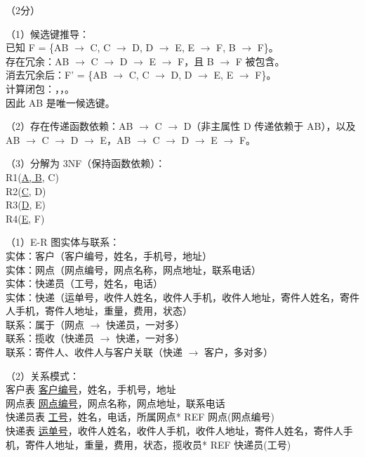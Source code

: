 \documentclass[a4paper,11pt]{article}
\begin{document}
\q （2分）


\q （1）候选键推导：\\
已知 F = \{AB $\rightarrow$ C, C $\rightarrow$ D, D $\rightarrow$ E, E $\rightarrow$ F, B $\rightarrow$ F\}。\\
存在冗余：AB $\rightarrow$ C $\rightarrow$ D $\rightarrow$ E $\rightarrow$ F，且 B $\rightarrow$ F 被包含。\\
消去冗余后：F' = \{AB $\rightarrow$ C, C $\rightarrow$ D, D $\rightarrow$ E, E $\rightarrow$ F\}。\\
计算闭包：，，。\\
因此 AB 是唯一候选键。

\par（2）存在传递函数依赖：AB $\rightarrow$ C $\rightarrow$ D（非主属性 D 传递依赖于 AB），以及 AB $\rightarrow$ C $\rightarrow$ D $\rightarrow$ E，AB $\rightarrow$ C $\rightarrow$ D $\rightarrow$ E $\rightarrow$ F。

\par（3）分解为 3NF（保持函数依赖）：\\
R1(\underline{A, B}, C)\\
R2(\underline{C}, D)\\
R3(\underline{D}, E)\\
R4(\underline{E}, F)


\q （1）E-R 图实体与联系：\\
实体：客户（客户编号，姓名，手机号，地址）\\
实体：网点（网点编号，网点名称，网点地址，联系电话）\\
实体：快递员（工号，姓名，电话）\\
实体：快递（运单号，收件人姓名，收件人手机，收件人地址，寄件人姓名，寄件人手机，寄件人地址，重量，费用，状态）\\
联系：属于（网点 $\to$ 快递员，一对多）\\
联系：揽收（快递员 $\to$ 快递，一对多）\\
联系：寄件人、收件人与客户关联（快递 $\to$ 客户，多对多）

\par（2）关系模式：\\
客户表 \underline{客户编号}，姓名，手机号，地址\\
网点表 \underline{网点编号}，网点名称，网点地址，联系电话\\
快递员表 \underline{工号}，姓名，电话，所属网点* REF 网点(网点编号)\\
快递表 \underline{运单号}，收件人姓名，收件人手机，收件人地址，寄件人姓名，寄件人手机，寄件人地址，重量，费用，状态，揽收员* REF 快递员(工号)
\end{document}

